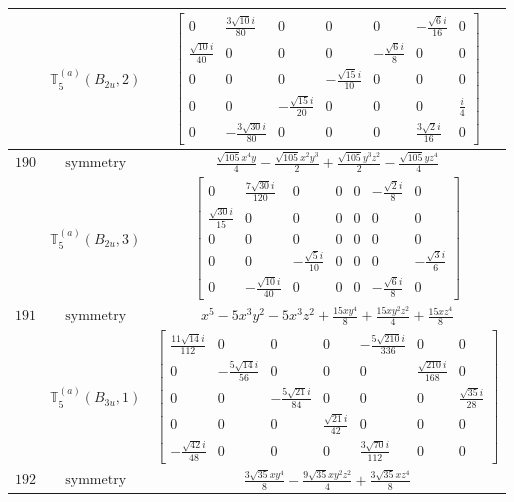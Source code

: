 \documentclass[fleqn,8pt,landscape]{jsarticle}
\begin{document}
\begin{longtable}{ccc}
$  $ & $ \mathbb{T}_{5}^{(a)}(B_{2u},2) $ & $ \begin{bmatrix} 0 & \frac{3 \sqrt{10} i}{80} & 0 & 0 & 0 & - \frac{\sqrt{6} i}{16} & 0 \\ \frac{\sqrt{10} i}{40} & 0 & 0 & 0 & - \frac{\sqrt{6} i}{8} & 0 & 0 \\ 0 & 0 & 0 & - \frac{\sqrt{15} i}{10} & 0 & 0 & 0 \\ 0 & 0 & - \frac{\sqrt{15} i}{20} & 0 & 0 & 0 & \frac{i}{4} \\ 0 & - \frac{3 \sqrt{30} i}{80} & 0 & 0 & 0 & \frac{3 \sqrt{2} i}{16} & 0 \end{bmatrix} $ \\ \hline
$ 190 $ & $ \text{symmetry} $ & $ \frac{\sqrt{105} x^{4} y}{4} - \frac{\sqrt{105} x^{2} y^{3}}{2} + \frac{\sqrt{105} y^{3} z^{2}}{2} - \frac{\sqrt{105} y z^{4}}{4} $ \\
$  $ & $ \mathbb{T}_{5}^{(a)}(B_{2u},3) $ & $ \begin{bmatrix} 0 & \frac{7 \sqrt{30} i}{120} & 0 & 0 & 0 & - \frac{\sqrt{2} i}{8} & 0 \\ \frac{\sqrt{30} i}{15} & 0 & 0 & 0 & 0 & 0 & 0 \\ 0 & 0 & 0 & 0 & 0 & 0 & 0 \\ 0 & 0 & - \frac{\sqrt{5} i}{10} & 0 & 0 & 0 & - \frac{\sqrt{3} i}{6} \\ 0 & - \frac{\sqrt{10} i}{40} & 0 & 0 & 0 & - \frac{\sqrt{6} i}{8} & 0 \end{bmatrix} $ \\ \hline
$ 191 $ & $ \text{symmetry} $ & $ x^{5} - 5 x^{3} y^{2} - 5 x^{3} z^{2} + \frac{15 x y^{4}}{8} + \frac{15 x y^{2} z^{2}}{4} + \frac{15 x z^{4}}{8} $ \\
$  $ & $ \mathbb{T}_{5}^{(a)}(B_{3u},1) $ & $ \begin{bmatrix} \frac{11 \sqrt{14} i}{112} & 0 & 0 & 0 & - \frac{5 \sqrt{210} i}{336} & 0 & 0 \\ 0 & - \frac{5 \sqrt{14} i}{56} & 0 & 0 & 0 & \frac{\sqrt{210} i}{168} & 0 \\ 0 & 0 & - \frac{5 \sqrt{21} i}{84} & 0 & 0 & 0 & \frac{\sqrt{35} i}{28} \\ 0 & 0 & 0 & \frac{\sqrt{21} i}{42} & 0 & 0 & 0 \\ - \frac{\sqrt{42} i}{48} & 0 & 0 & 0 & \frac{3 \sqrt{70} i}{112} & 0 & 0 \end{bmatrix} $ \\ \hline
$ 192 $ & $ \text{symmetry} $ & $ \frac{3 \sqrt{35} x y^{4}}{8} - \frac{9 \sqrt{35} x y^{2} z^{2}}{4} + \frac{3 \sqrt{35} x z^{4}}{8} $ \\

\end{longtable}
\end{document}
